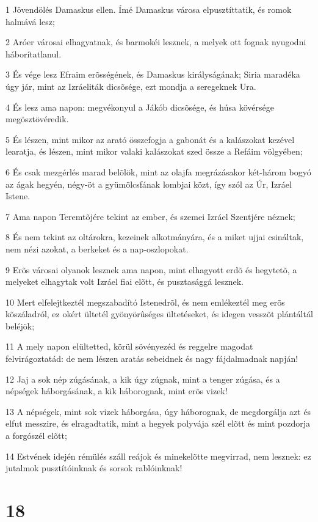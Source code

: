 \par 1 Jövendölés Damaskus ellen. Ímé Damaskus városa elpusztíttatik, és romok halmává lesz;
\par 2 Aróer városai elhagyatnak, és barmokéi lesznek, a melyek ott fognak nyugodni háborítatlanul.
\par 3 És vége lesz Efraim erõsségének, és Damaskus királyságának; Siria maradéka úgy jár, mint az Izráeliták dicsõsége, ezt mondja a seregeknek Ura.
\par 4 És lesz ama napon: megvékonyul a Jákób dicsõsége, és húsa kövérsége megösztövéredik.
\par 5 És lészen, mint mikor az arató összefogja a gabonát és a kalászokat kezével learatja, és lészen, mint mikor valaki kalászokat szed össze a Refáim völgyében;
\par 6 És csak mezgérlés marad belõlök, mint az olajfa megrázásakor két-három bogyó az ágak hegyén, négy-öt a gyümölcsfának lombjai közt, így szól az Úr, Izráel Istene.
\par 7 Ama napon Teremtõjére tekint az ember, és szemei Izráel Szentjére néznek;
\par 8 És nem tekint az oltárokra, kezeinek alkotmányára, és a miket ujjai csináltak, nem nézi azokat, a berkeket és a nap-oszlopokat.
\par 9 Erõs városai olyanok lesznek ama napon, mint elhagyott erdõ és hegytetõ, a melyeket elhagytak volt Izráel fiai elõtt, és pusztasággá lesznek.
\par 10 Mert elfelejtkeztél megszabadító Istenedrõl, és nem emlékeztél meg erõs kõszáladról, ez okért ültetél gyönyörûséges ültetéseket, és idegen vesszõt plántáltál beléjök;
\par 11 A mely napon elültetted, körül sövényezéd és reggelre magodat felvirágoztatád: de nem lészen aratás sebeidnek és nagy fájdalmadnak napján!
\par 12 Jaj a sok nép zúgásának, a kik úgy zúgnak, mint a tenger zúgása, és a népségek háborgásának, a kik háborognak, mint erõs vizek!
\par 13 A népségek, mint sok vizek háborgása, úgy háborognak, de megdorgálja azt és elfut messzire, és elragadtatik, mint a hegyek polyvája szél elõtt és mint pozdorja a forgószél elõtt;
\par 14 Estvének idején rémülés száll reájok és minekelõtte megvirrad, nem lesznek: ez jutalmok pusztítóinknak és sorsok rablóinknak!

\chapter{18}

